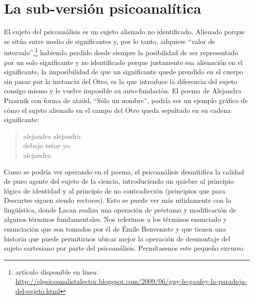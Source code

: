 \section{La sub-versión psicoanalítica}


El sujeto del psicoanálisis es un sujeto alienado no identificado. Alienado porque se sitúa entre medio de significantes y, por lo tanto, adquiere \enquote{valor de intervalo},\footnote{\cite[][]{@7120-LEGAUFEY2009} artículo disponible en línea: \url{http://elpsicoanalistalector.blogspot.com/2009/06/guy-le-gaufey-la-paradoja-del-sujeto.html}} habiendo perdido desde siempre la posibilidad de ser representado por un solo significante y no identificado porque justamente esa alienación en el significante, la imposibilidad de que un significante quede prendido en el cuerpo sin pasar por la instancia del Otro, es la que introduce la diferencia del sujeto consigo mismo y le vuelve imposible su auto-fundación. El poema de Alejandra Pizarnik con forma de ataúd, \enquote{Sólo un nombre}, podría ser un ejemplo gráfico de cómo el sujeto alienado en el campo del Otro queda sepultado en su cadena significante:

\begin{verse}
	alejandra alejandra \\debajo estoy yo\\alejandra
\end{verse}

Como se podría ver operando en el poema, el psicoanálisis desmitifica la calidad de puro agente del sujeto de la ciencia, introduciendo un quiebre al principio lógico de identidad y al principio de no contradicción (principios que para Descartes siguen siendo rectores). Esto se puede ver más nítidamente con la lingüística, donde Lacan realiza una operación de préstamo y modificación de algunos términos fundamentales. Nos referimos a los términos enunciado y enunciación que son tomados por él de Émile Benveniste y que tienen una historia que puede permitirnos ubicar mejor la operación de desmontaje del sujeto cartesiano por parte del psicoanálisis. Permítasenos este pequeño excurso.

